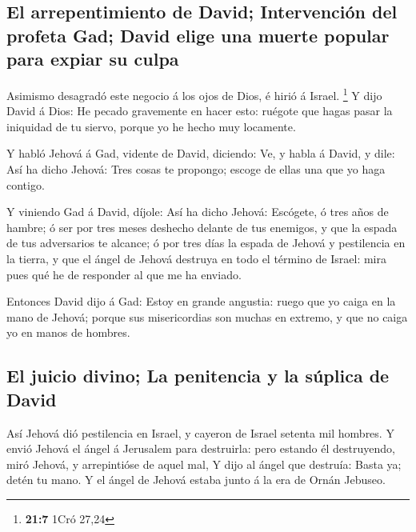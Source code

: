 \hypertarget{el-arrepentimiento-de-david-intervenciuxf3n-del-profeta-gad-david-elige-una-muerte-popular-para-expiar-su-culpa}{%
\subsection{El arrepentimiento de David; Intervención del profeta Gad;
David elige una muerte popular para expiar su
culpa}\label{el-arrepentimiento-de-david-intervenciuxf3n-del-profeta-gad-david-elige-una-muerte-popular-para-expiar-su-culpa}}

 Asimismo desagradó este negocio á los ojos de Dios, é hirió
á Israel. \footnote{\textbf{21:7} 1Cró 27,24}  Y dijo David
á Dios: He pecado gravemente en hacer esto: ruégote que hagas pasar la
iniquidad de tu siervo, porque yo he hecho muy locamente.

 Y habló Jehová á Gad, vidente de David, diciendo:
 Ve, y habla á David, y dile: Así ha dicho Jehová: Tres
cosas te propongo; escoge de ellas una que yo haga contigo.

 Y viniendo Gad á David, díjole: Así ha dicho Jehová:
 Escógete, ó tres años de hambre; ó ser por tres meses
deshecho delante de tus enemigos, y que la espada de tus adversarios te
alcance; ó por tres días la espada de Jehová y pestilencia en la tierra,
y que el ángel de Jehová destruya en todo el término de Israel: mira
pues qué he de responder al que me ha enviado.

 Entonces David dijo á Gad: Estoy en grande angustia: ruego
que yo caiga en la mano de Jehová; porque sus misericordias son muchas
en extremo, y que no caiga yo en manos de hombres.

\hypertarget{el-juicio-divino-la-penitencia-y-la-suxfaplica-de-david}{%
\subsection{El juicio divino; La penitencia y la súplica de
David}\label{el-juicio-divino-la-penitencia-y-la-suxfaplica-de-david}}

 Así Jehová dió pestilencia en Israel, y cayeron de Israel
setenta mil hombres.  Y envió Jehová el ángel á Jerusalem
para destruirla: pero estando él destruyendo, miró Jehová, y
arrepintióse de aquel mal,  Y dijo al ángel que destruía:
Basta ya; detén tu mano. Y el ángel de Jehová estaba junto á la era de
Ornán Jebuseo.

